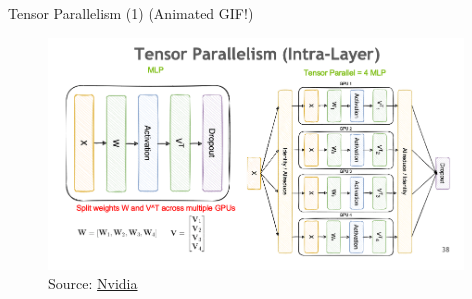 \begin{vbframe}{Tensor Parallelism (1) (Animated GIF!)}

\vfill

\begin{figure}
	\centering
	\includegraphics[width = 11cm]{./figure/tensor_parallel.png} \\ 
	{\footnotesize Source: \href{https://docs.nvidia.com/nemo-framework/user-guide/latest/nemotoolkit/features/parallelisms.html#tensor-parallelism}{Nvidia}}
\end{figure}

\vfill

\end{vbframe}


